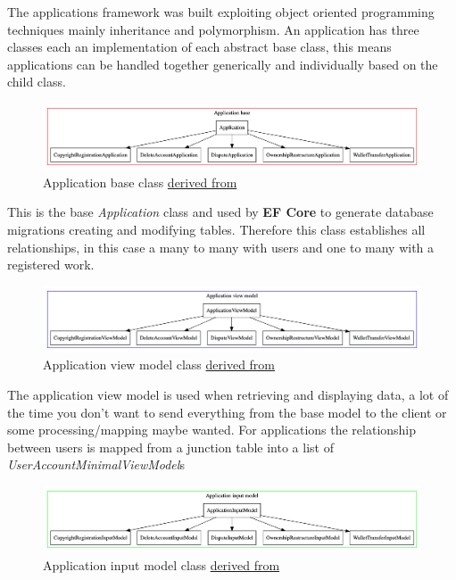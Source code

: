 \documentclass[12pt]{article}
\begin{document}
The applications framework was built exploiting object oriented programming techniques mainly inheritance and polymorphism. An application has three classes each an implementation of each abstract base class, this means applications can be handled together generically and individually based on the child class.

\begin{figure}[H]
\caption{Application base class \href{https://github.com/MrHarrisonBarker/CRPL/blob/main/CRPL.Data/Applications/DataModels/Application.cs}{derived from}}
\centering
\includegraphics[width=\textwidth,height=0.5\textheight,keepaspectratio]{images/operational/application-base}
\end{figure}

This is the base \textit{Application} class and used by \textbf{EF Core} to generate database migrations creating and modifying tables. Therefore this class establishes all relationships, in this case a many to many with users and one to many with a registered work.

\begin{figure}[H]
\caption{Application view model class \href{https://github.com/MrHarrisonBarker/CRPL/blob/main/CRPL.Data/Applications/ViewModels/ApplicationViewModel.cs}{derived from}}
\centering
\includegraphics[width=\textwidth,height=0.5\textheight,keepaspectratio]{images/operational/application-view}
\end{figure}

The application view model is used when retrieving and displaying data, a lot of the time you don't want to send everything from the base model to the client or some processing/mapping maybe wanted. For applications the relationship between users is mapped from a junction table into a list of \textit{UserAccountMinimalViewModel}s
 
\begin{figure}[H]
\caption{Application input model class \href{https://github.com/MrHarrisonBarker/CRPL/blob/main/CRPL.Data/Applications/InputModels/ApplicationInputModel.cs}{derived from}}
\centering
\includegraphics[width=\textwidth,height=0.5\textheight,keepaspectratio]{images/operational/application-input}
\end{figure}
\end{document}
